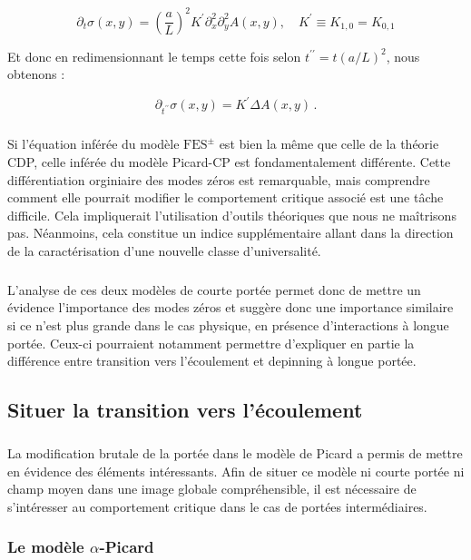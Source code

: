 \begin{equation}
    \partial_t\sigma (x,y) = \left( \frac{a}{L} \right)^{2}K^\prime\partial_x^{2}\partial_y^{2}A(x, y), \quad K^\prime \equiv K_{1,0} = K_{0,1}
    \label{eq:evol:sigma:CDP:raw}
\end{equation}

\noindent Et donc en redimensionnant le temps cette fois selon $t^{\prime\prime}=t(a/L)^2$, nous obtenons :

\begin{equation}
    \partial_{t^{\prime\prime}}\sigma (x,y) = K^\prime\Delta A(x, y)\, .
    \label{eq:evol:sigma:CDP}
\end{equation}

\subparagraph{}Si l'équation inférée du modèle $\text{FES}^\pm$ est bien la même que celle de la théorie CDP, celle inférée du modèle Picard-CP est fondamentalement différente. Cette différentiation orginiaire des modes zéros est remarquable, mais comprendre comment elle pourrait modifier le comportement critique associé est une tâche difficile. Cela impliquerait l'utilisation d'outils théoriques que nous ne maîtrisons pas. Néanmoins, cela constitue un indice supplémentaire allant dans la direction de la caractérisation d'une nouvelle classe d'universalité.

\subparagraph{}L'analyse de ces deux modèles de courte portée permet donc de mettre un évidence l'importance des modes zéros et suggère donc une importance similaire si ce n'est plus grande dans le cas physique, en présence d'interactions à longue portée. Ceux-ci pourraient notamment permettre d'expliquer en partie la différence entre transition vers l'écoulement et depinning à longue portée.

\subsection{Situer la transition vers l'écoulement}

\label{sec:alphaPicard}

\subparagraph{}La modification brutale de la portée dans le modèle de Picard a permis de mettre en évidence des éléments intéressants. Afin de situer ce modèle ni courte portée ni champ moyen dans une image globale compréhensible, il est nécessaire de s'intéresser au comportement critique dans le cas de portées intermédiaires. 

\subsubsection{Le modèle $\alpha$-Picard}

